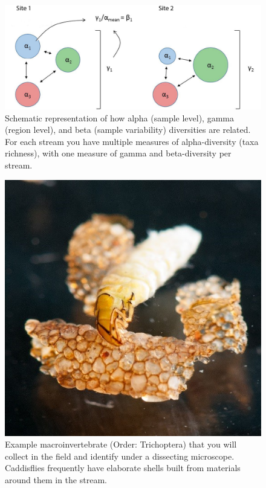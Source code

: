 \documentclass[]{book}
\begin{document}
\begin{figure}
\centering
\includegraphics{chapter_materials/biodiversity_ecology/partitioning.jpg}
\caption{\label{fig:partition-fig}Schematic representation of how alpha (sample level), gamma (region level), and beta (sample variability) diversities are related. For each stream you have multiple measures of alpha-diversity (taxa richness), with one measure of gamma and beta-diversity per stream.}
\end{figure}

\begin{figure}
\centering
\includegraphics{chapter_materials/biodiversity_ecology/invert_pic.jpg}
\caption{\label{fig:invert-fig}Example macroinvertebrate (Order: Trichoptera) that you will collect in the field and identify under a dissecting microscope. Caddisflies frequently have elaborate shells built from materials around them in the stream.}
\end{figure}
\end{document}
